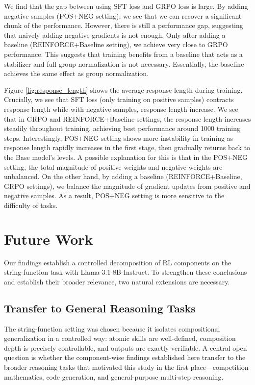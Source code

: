 \documentclass[12pt]{cmuthesis}
\begin{document}
We find that the gap between using SFT loss and GRPO loss is large. By adding negative samples (POS+NEG setting), we see that we can recover a significant chunk of the performance. However, there is still a performance gap, suggesting that naively adding negative gradients is not enough. Only after adding a baseline (REINFORCE+Baseline setting), we achieve very close to GRPO performance. This suggests that training benefits from a baseline that acts as a stabilizer and full group normalization is not necessary. Essentially, the baseline achieves the same effect as group normalization.

Figure \ref{fig:response_length} shows the average response length during training. Crucially, we see that SFT loss (only training on positive samples) contracts response length while with negative samples, response length increase. We see that in GRPO and REINFORCE+Baseline settings, the response length increases steadily throughout training, achieving best performance around 1000 training steps. Interestingly, POS+NEG setting shows more instability in training as response length rapidly increases in the first stage, then gradually returns back to the Base model's levels. A possible explanation for this is that in the POS+NEG setting, the total magnitude of positive weights and negative weights are unbalanced. On the other hand, by adding a baseline (REINFORCE+Baseline, GRPO settings), we balance the magnitude of gradient updates from positive and negative samples. As a result, POS+NEG setting is more sensitive to the difficulty of tasks. 
    


\chapter{Future Work}

Our findings establish a controlled decomposition of RL components on the string-function task with Llama-3.1-8B-Instruct. To strengthen these conclusions and establish their broader relevance, two natural extensions are necessary.

\section{Transfer to General Reasoning Tasks}

The string-function setting was chosen because it isolates compositional generalization in a controlled way: atomic skills are well-defined, composition depth is precisely controllable, and outputs are exactly verifiable. A central open question is whether the component-wise findings established here transfer to the broader reasoning tasks that motivated this study in the first place---competition mathematics, code generation, and general-purpose multi-step reasoning.
\end{document}
